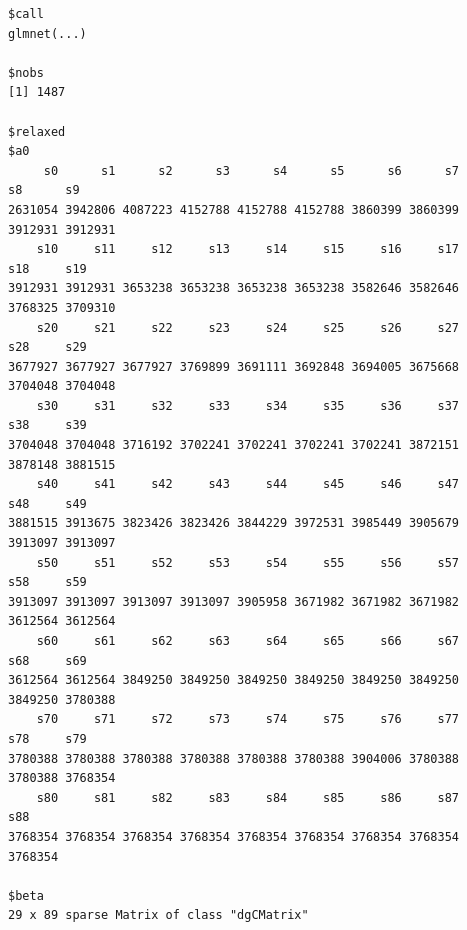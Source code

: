 \documentclass[
]{article}
\begin{document}
\begin{verbatim}
$call
glmnet(...)

$nobs
[1] 1487

$relaxed
$a0
     s0      s1      s2      s3      s4      s5      s6      s7      s8      s9 
2631054 3942806 4087223 4152788 4152788 4152788 3860399 3860399 3912931 3912931 
    s10     s11     s12     s13     s14     s15     s16     s17     s18     s19 
3912931 3912931 3653238 3653238 3653238 3653238 3582646 3582646 3768325 3709310 
    s20     s21     s22     s23     s24     s25     s26     s27     s28     s29 
3677927 3677927 3677927 3769899 3691111 3692848 3694005 3675668 3704048 3704048 
    s30     s31     s32     s33     s34     s35     s36     s37     s38     s39 
3704048 3704048 3716192 3702241 3702241 3702241 3702241 3872151 3878148 3881515 
    s40     s41     s42     s43     s44     s45     s46     s47     s48     s49 
3881515 3913675 3823426 3823426 3844229 3972531 3985449 3905679 3913097 3913097 
    s50     s51     s52     s53     s54     s55     s56     s57     s58     s59 
3913097 3913097 3913097 3913097 3905958 3671982 3671982 3671982 3612564 3612564 
    s60     s61     s62     s63     s64     s65     s66     s67     s68     s69 
3612564 3612564 3849250 3849250 3849250 3849250 3849250 3849250 3849250 3780388 
    s70     s71     s72     s73     s74     s75     s76     s77     s78     s79 
3780388 3780388 3780388 3780388 3780388 3780388 3904006 3780388 3780388 3768354 
    s80     s81     s82     s83     s84     s85     s86     s87     s88 
3768354 3768354 3768354 3768354 3768354 3768354 3768354 3768354 3768354 

$beta
29 x 89 sparse Matrix of class "dgCMatrix"
\end{verbatim}
\end{document}
